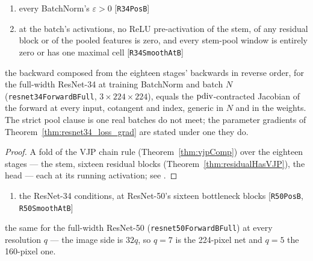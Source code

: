 \begin{theorem}
  \label{thm:resnet34FullHasVJP}
  \leanok
  \Assume{}
  \begin{enumerate}
    \item every BatchNorm's \(\varepsilon > 0\) \hfill[\texttt{R34PosB}]
    \item at the batch's activations, no ReLU pre-activation of the stem, of
          any residual block or of the pooled features is zero, and every
          stem-pool window is entirely zero or has one maximal cell
          \hfill[\texttt{R34SmoothAtB}]
  \end{enumerate}
  \Prove{} the backward composed from the eighteen stages' backwards in
  reverse order, for the full-width ResNet-34 at training BatchNorm and batch
  \(N\) (\texttt{resnet34ForwardBFull}, \(3 \times 224 \times 224\)), equals
  the \(\operatorname{pdiv}\)-contracted Jacobian of the forward at every input, cotangent
  and index, generic in \(N\) and in the weights. The strict pool clause is
  one real batches do not meet; the parameter gradients of
  Theorem~\ref{thm:resnet34_loss_grad} are stated under one they do.
\end{theorem}

\begin{proof}
\leanok
A fold of the VJP chain rule (Theorem~\ref{thm:vjpComp}) over the eighteen
stages --- the stem, sixteen residual blocks
(Theorem~\ref{thm:residualHasVJP}), the head --- each at its running
activation; see .
\end{proof}

\begin{theorem}
  \label{thm:resnet50FullHasVJP}
  \leanok
  \Assume{}
  \begin{enumerate}
    \item the ResNet-34 conditions, at ResNet-50's sixteen bottleneck blocks
          \hfill[\texttt{R50PosB}, \texttt{R50SmoothAtB}]
  \end{enumerate}
  \Prove{} the same for the full-width ResNet-50
  (\texttt{resnet50ForwardBFull}) at every resolution \(q\) --- the image side
  is \(32q\), so \(q = 7\) is the 224-pixel net and \(q = 5\) the 160-pixel
  one.
\end{theorem}

